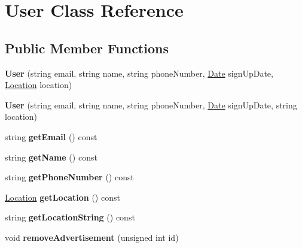 \hypertarget{class_user}{}\section{User Class Reference}
\label{class_user}
\subsection*{Public Member Functions}
\begin{DoxyCompactItemize}
\item 
\hypertarget{class_user_a39acccb1a01fe3136c79b2d32e474f54}{}{\bfseries User} (string email, string name, string phone\+Number, \hyperlink{class_date}{Date} sign\+Up\+Date, \hyperlink{class_location}{Location} location)\label{class_user_a39acccb1a01fe3136c79b2d32e474f54}

\item 
\hypertarget{class_user_af2e52345004e31d51dfc1fc72d635289}{}{\bfseries User} (string email, string name, string phone\+Number, \hyperlink{class_date}{Date} sign\+Up\+Date, string location)\label{class_user_af2e52345004e31d51dfc1fc72d635289}

\item 
\hypertarget{class_user_ac8a15550f3596a7ef13eb31b82a8ecf6}{}string {\bfseries get\+Email} () const \label{class_user_ac8a15550f3596a7ef13eb31b82a8ecf6}

\item 
\hypertarget{class_user_a2b2a3d00d303affb4f5674bc9788db52}{}string {\bfseries get\+Name} () const \label{class_user_a2b2a3d00d303affb4f5674bc9788db52}

\item 
\hypertarget{class_user_a4d59412a7d7411dd8c8127adc9e80fae}{}string {\bfseries get\+Phone\+Number} () const \label{class_user_a4d59412a7d7411dd8c8127adc9e80fae}

\item 
\hypertarget{class_user_a7c2072cbf540ae1bd47992b40783843c}{}\hyperlink{class_location}{Location} {\bfseries get\+Location} () const \label{class_user_a7c2072cbf540ae1bd47992b40783843c}

\item 
\hypertarget{class_user_a7185d303044e8dbb683b717228e2560d}{}string {\bfseries get\+Location\+String} () const \label{class_user_a7185d303044e8dbb683b717228e2560d}

\item 
\hypertarget{class_user_aa3bb1db20bfdae4ae26f8e5b84360f45}{}void {\bfseries remove\+Advertisement} (unsigned int id)\label{class_user_aa3bb1db20bfdae4ae26f8e5b84360f45}

\end{DoxyCompactItemize}
